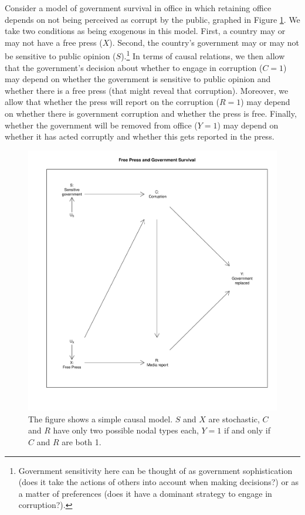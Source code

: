\documentclass[
  12pt,
]{book}
\begin{document}
Consider a model of government survival in office in which retaining office depends on not being perceived as corrupt by the public, graphed in Figure \ref{fig:running}. We take two conditions as being exogenous in this model. First, a country may or may not have a free press (\(X\)). Second, the country's government may or may not be sensitive to public opinion (\(S\)).\footnote{Government sensitivity here can be thought of as government sophistication (does it take the actions of others into account when making decisions?) or as a matter of preferences (does it have a dominant strategy to engage in corruption?).} In terms of causal relations, we then allow that the government's decision about whether to engage in corruption (\(C=1\)) may depend on whether the government is sensitive to public opinion and whether there is a free press (that might reveal that corruption). Moreover, we allow that whether the press will report on the corruption (\(R=1\)) may depend on whether there is government corruption and whether the press is free. Finally, whether the government will be removed from office (\(Y=1\)) may depend on whether it has acted corruptly and whether this gets reported in the press.

\begin{figure}

{\centering \includegraphics[width=0.7\linewidth]{ii_files/figure-latex/running-1} 

}

\caption{The figure shows a simple causal model. $S$ and $X$ are stochastic, $C$ and $R$ have only two possible nodal types each, $Y=1$ if and only if $C$ and $R$ are both 1.}\label{fig:running}
\end{figure}
\end{document}
